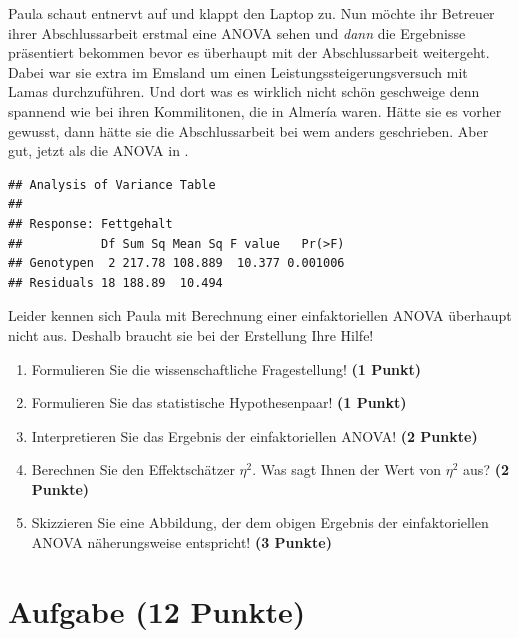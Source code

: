 \documentclass[a4paper, 9pt]{scrartcl}\usepackage[]{graphicx}\usepackage[]{xcolor}
\makeatletter
\newenvironment{kframe}{%
 \def\at@end@of@kframe{}%
 \ifinner\ifhmode%
  \def\at@end@of@kframe{\end{minipage}}%
  \begin{minipage}{\columnwidth}%
 \fi\fi%
 \def\FrameCommand##1{\hskip\@totalleftmargin \hskip-\fboxsep
 \colorbox{shadecolor}{##1}\hskip-\fboxsep
     \hskip-\linewidth \hskip-\@totalleftmargin \hskip\columnwidth}%
 \MakeFramed {\advance\hsize-\width
   \@totalleftmargin\z@ \linewidth\hsize
   \@setminipage}}%
 {\par\unskip\endMakeFramed%
 \at@end@of@kframe}
\newenvironment{knitrout}{}{} %
\makeatother
\begin{document}
Paula schaut entnervt auf und klappt den Laptop zu. Nun möchte ihr Betreuer ihrer Abschlussarbeit erstmal eine ANOVA sehen und \textit{dann} die Ergebnisse präsentiert bekommen bevor es überhaupt mit der Abschlussarbeit weitergeht. Dabei war sie extra im Emsland um einen Leistungssteigerungsversuch mit Lamas durchzuführen. Und dort was es wirklich nicht schön geschweige denn spannend wie bei ihren Kommilitonen, die in Almería waren. Hätte sie es vorher gewusst, dann hätte sie die Abschlussarbeit bei wem anders geschrieben. Aber gut, jetzt als die ANOVA in \Rlogo.

\begin{knitrout}
\color{fgcolor}\begin{kframe}
\begin{verbatim}
## Analysis of Variance Table
## 
## Response: Fettgehalt
##           Df Sum Sq Mean Sq F value   Pr(>F)
## Genotypen  2 217.78 108.889  10.377 0.001006
## Residuals 18 188.89  10.494
\end{verbatim}
\end{kframe}
\end{knitrout}

\vspace{1ex}

Leider kennen sich Paula mit Berechnung einer einfaktoriellen ANOVA überhaupt nicht aus. Deshalb braucht sie bei der Erstellung Ihre Hilfe! 

\begin{enumerate}
  \item Formulieren Sie die wissenschaftliche Fragestellung! \textbf{(1 Punkt)}
  \item Formulieren Sie das statistische Hypothesenpaar! \textbf{(1 Punkt)}
\item Interpretieren Sie das Ergebnis der einfaktoriellen ANOVA! \textbf{(2 Punkte)} 
\item Berechnen Sie den Effektschätzer $\eta^2$. Was sagt Ihnen der Wert von $\eta^2$ aus? \textbf{(2 Punkte)}
\item Skizzieren Sie eine Abbildung, der dem obigen Ergebnis der
  einfaktoriellen ANOVA näherungsweise entspricht! \textbf{(3 Punkte)}
\end{enumerate}

 
\clearpage

\section{Aufgabe \hfill (12 Punkte)}
\end{document}
